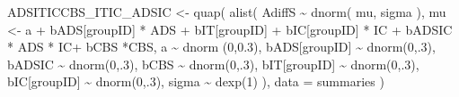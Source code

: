 \documentclass[
  10pt,
  dvipsnames,enabledeprecatedfontcommands]{scrartcl}
\newenvironment{Shaded}{\begin{snugshade}}{\end{snugshade}}
\newcommand{\AttributeTok}[1]{\textcolor[rgb]{0.77,0.63,0.00}{#1}}
\newcommand{\DecValTok}[1]{\textcolor[rgb]{0.00,0.00,0.81}{#1}}
\newcommand{\FloatTok}[1]{\textcolor[rgb]{0.00,0.00,0.81}{#1}}
\newcommand{\FunctionTok}[1]{\textcolor[rgb]{0.00,0.00,0.00}{#1}}
\newcommand{\NormalTok}[1]{#1}
\newcommand{\OtherTok}[1]{\textcolor[rgb]{0.56,0.35,0.01}{#1}}
\newcommand{\SpecialCharTok}[1]{\textcolor[rgb]{0.00,0.00,0.00}{#1}}
\begin{document}
\begin{Shaded}
\begin{Highlighting}[]
\NormalTok{ADSITICCBS\_ITIC\_ADSIC }\OtherTok{\textless{}{-}} \FunctionTok{quap}\NormalTok{(}
  \FunctionTok{alist}\NormalTok{(}
\NormalTok{    AdiffS }\SpecialCharTok{\textasciitilde{}} \FunctionTok{dnorm}\NormalTok{( mu, sigma ),}
\NormalTok{    mu }\OtherTok{\textless{}{-}}\NormalTok{ a }\SpecialCharTok{+}\NormalTok{ bADS[groupID] }\SpecialCharTok{*}\NormalTok{ ADS }\SpecialCharTok{+}\NormalTok{  bIT[groupID] }\SpecialCharTok{+}\NormalTok{ bIC[groupID] }\SpecialCharTok{*}\NormalTok{ IC }\SpecialCharTok{+} 
\NormalTok{      bADSIC }\SpecialCharTok{*}\NormalTok{ ADS }\SpecialCharTok{*}\NormalTok{ IC}\SpecialCharTok{+}\NormalTok{ bCBS }\SpecialCharTok{*}\NormalTok{CBS,}
\NormalTok{    a }\SpecialCharTok{\textasciitilde{}} \FunctionTok{dnorm}\NormalTok{ (}\DecValTok{0}\NormalTok{,}\FloatTok{0.3}\NormalTok{),}
\NormalTok{    bADS[groupID] }\SpecialCharTok{\textasciitilde{}} \FunctionTok{dnorm}\NormalTok{(}\DecValTok{0}\NormalTok{,.}\DecValTok{3}\NormalTok{),}
\NormalTok{    bADSIC }\SpecialCharTok{\textasciitilde{}} \FunctionTok{dnorm}\NormalTok{(}\DecValTok{0}\NormalTok{,.}\DecValTok{3}\NormalTok{),}
\NormalTok{    bCBS }\SpecialCharTok{\textasciitilde{}} \FunctionTok{dnorm}\NormalTok{(}\DecValTok{0}\NormalTok{,.}\DecValTok{3}\NormalTok{),}
\NormalTok{    bIT[groupID] }\SpecialCharTok{\textasciitilde{}} \FunctionTok{dnorm}\NormalTok{(}\DecValTok{0}\NormalTok{,.}\DecValTok{3}\NormalTok{),}
\NormalTok{    bIC[groupID] }\SpecialCharTok{\textasciitilde{}} \FunctionTok{dnorm}\NormalTok{(}\DecValTok{0}\NormalTok{,.}\DecValTok{3}\NormalTok{),}
\NormalTok{    sigma  }\SpecialCharTok{\textasciitilde{}} \FunctionTok{dexp}\NormalTok{(}\DecValTok{1}\NormalTok{)}
\NormalTok{  ), }
  \AttributeTok{data =}\NormalTok{ summaries}
\NormalTok{)}



\end{Highlighting}
\end{Shaded}
\end{document}

